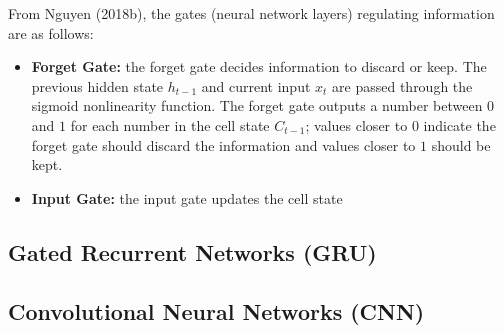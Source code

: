 From Nguyen (2018b), the gates (neural network layers) regulating information are as follows: 

\begin{itemize}
    \item \textbf{Forget Gate: } the forget gate decides information to discard or keep. The previous hidden state $h_{t-1}$ and current input $x_t$ are passed through the sigmoid nonlinearity function. The forget gate outputs a number between $0$ and $1$ for each number in the cell state $C_{t-1}$; values closer to $0$ indicate the forget gate should discard the information and values closer to $1$ should be kept. 
    
    \item \textbf{Input Gate: } the input gate updates the cell state
\end{itemize}

\subsection{Gated Recurrent Networks (GRU)}

\subsection{Convolutional Neural Networks (CNN)}